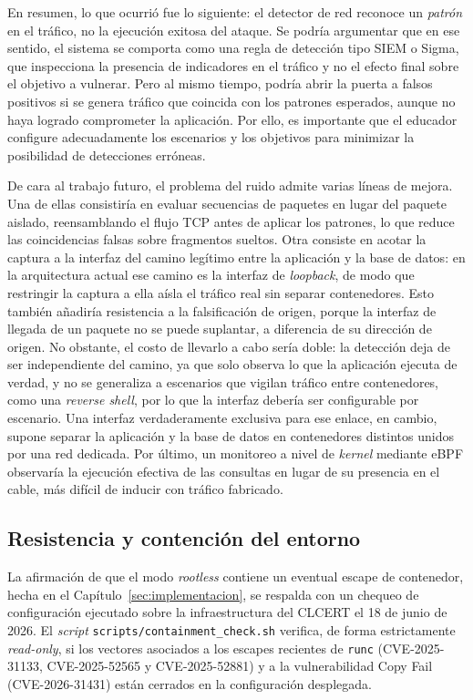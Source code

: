 En resumen, lo que ocurrió fue lo siguiente: el detector de red
reconoce un \textit{patrón} en el tráfico, no la ejecución exitosa del ataque.
Se podría argumentar que en ese sentido, el sistema se comporta como una regla
de detección tipo SIEM o Sigma, que inspecciona la presencia de indicadores en
el tráfico y no el efecto final sobre el objetivo a vulnerar. Pero al mismo
tiempo, podría abrir la puerta a falsos positivos si se genera tráfico que
coincida con los patrones esperados, aunque no haya logrado comprometer la
aplicación. Por ello, es importante que el educador configure adecuadamente los
escenarios y los objetivos para minimizar la posibilidad de detecciones
erróneas.

De cara al trabajo futuro, el problema del ruido admite varias líneas de
mejora. Una de ellas consistiría en evaluar secuencias de paquetes en lugar del
paquete aislado, reensamblando el flujo TCP antes de aplicar los patrones, lo
que reduce las coincidencias falsas sobre fragmentos sueltos. Otra
consiste en acotar la captura a la interfaz del camino
legítimo entre la aplicación y la base de datos: en la arquitectura actual ese
camino es la interfaz de \textit{loopback}, de modo que restringir la captura a ella
aísla el tráfico real sin separar contenedores. Esto también añadiría resistencia 
a la falsificación de origen, porque la interfaz de llegada de un paquete no se
puede suplantar, a diferencia de su dirección de origen. No obstante, el
costo de llevarlo a cabo sería doble: la detección deja de ser independiente 
del camino, ya que solo observa lo que la aplicación ejecuta de verdad, y no 
se generaliza a escenarios que vigilan
tráfico entre contenedores, como una \textit{reverse shell}, por lo que la
interfaz debería ser configurable por escenario. Una interfaz verdaderamente
exclusiva para ese enlace, en cambio, supone separar la aplicación y la base
de datos en contenedores distintos unidos por una red dedicada. Por último, un
monitoreo a nivel de \textit{kernel} mediante eBPF observaría la ejecución
efectiva de las consultas en lugar de su presencia en el cable, más difícil de
inducir con tráfico fabricado.

\subsection{Resistencia y contención del entorno}
\label{sec:contencion}

La afirmación de que el modo \textit{rootless} contiene un eventual escape de
contenedor, hecha en el Capítulo~\ref{sec:implementacion}, se respalda con un
chequeo de configuración ejecutado sobre la infraestructura del CLCERT el 18 de
junio de 2026. El \textit{script} \texttt{scripts/containment\_check.sh}
verifica, de forma estrictamente \textit{read-only}, si los vectores asociados a
los escapes recientes de \texttt{runc} (CVE-2025-31133, CVE-2025-52565 y
CVE-2025-52881) y a la vulnerabilidad Copy Fail (CVE-2026-31431) están cerrados
en la configuración desplegada.

